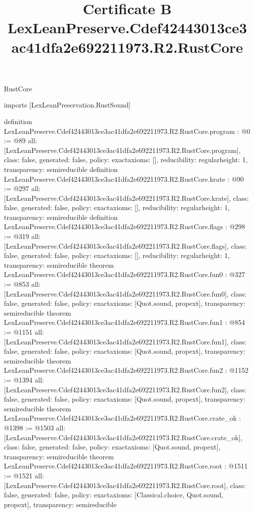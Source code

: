 \begin{lexlean}{RustCore}
\title{Certificate B LexLeanPreserve.Cdef42443013ce3ac41dfa2e692211973.R2.RustCore}
\begin{coremodule}
imports [LexLeanPreservation.RustSound]

definition LexLeanPreserve.Cdef42443013ce3ac41dfa2e692211973.R2.RustCore.program : @0 := @89 {
  all: [LexLeanPreserve.Cdef42443013ce3ac41dfa2e692211973.R2.RustCore.program],
  class: false,
  generated: false,
  policy: exact{axioms: []},
  reducibility: regular{height: 1},
  transparency: semireducible
}
definition LexLeanPreserve.Cdef42443013ce3ac41dfa2e692211973.R2.RustCore.krate : @90 := @297 {
  all: [LexLeanPreserve.Cdef42443013ce3ac41dfa2e692211973.R2.RustCore.krate],
  class: false,
  generated: false,
  policy: exact{axioms: []},
  reducibility: regular{height: 1},
  transparency: semireducible
}
definition LexLeanPreserve.Cdef42443013ce3ac41dfa2e692211973.R2.RustCore.flags : @298 := @319 {
  all: [LexLeanPreserve.Cdef42443013ce3ac41dfa2e692211973.R2.RustCore.flags],
  class: false,
  generated: false,
  policy: exact{axioms: []},
  reducibility: regular{height: 1},
  transparency: semireducible
}
theorem LexLeanPreserve.Cdef42443013ce3ac41dfa2e692211973.R2.RustCore.fun0 : @327 := @853 {
  all: [LexLeanPreserve.Cdef42443013ce3ac41dfa2e692211973.R2.RustCore.fun0],
  class: false,
  generated: false,
  policy: exact{axioms: [Quot.sound, propext]},
  transparency: semireducible
}
theorem LexLeanPreserve.Cdef42443013ce3ac41dfa2e692211973.R2.RustCore.fun1 : @854 := @1151 {
  all: [LexLeanPreserve.Cdef42443013ce3ac41dfa2e692211973.R2.RustCore.fun1],
  class: false,
  generated: false,
  policy: exact{axioms: [Quot.sound, propext]},
  transparency: semireducible
}
theorem LexLeanPreserve.Cdef42443013ce3ac41dfa2e692211973.R2.RustCore.fun2 : @1152 := @1394 {
  all: [LexLeanPreserve.Cdef42443013ce3ac41dfa2e692211973.R2.RustCore.fun2],
  class: false,
  generated: false,
  policy: exact{axioms: [Quot.sound, propext]},
  transparency: semireducible
}
theorem LexLeanPreserve.Cdef42443013ce3ac41dfa2e692211973.R2.RustCore.crate_ok : @1398 := @1503 {
  all: [LexLeanPreserve.Cdef42443013ce3ac41dfa2e692211973.R2.RustCore.crate_ok],
  class: false,
  generated: false,
  policy: exact{axioms: [Quot.sound, propext]},
  transparency: semireducible
}
theorem LexLeanPreserve.Cdef42443013ce3ac41dfa2e692211973.R2.RustCore.root : @1511 := @1521 {
  all: [LexLeanPreserve.Cdef42443013ce3ac41dfa2e692211973.R2.RustCore.root],
  class: false,
  generated: false,
  policy: exact{axioms: [Classical.choice, Quot.sound, propext]},
  transparency: semireducible
}


\end{coremodule}
\end{lexlean}
